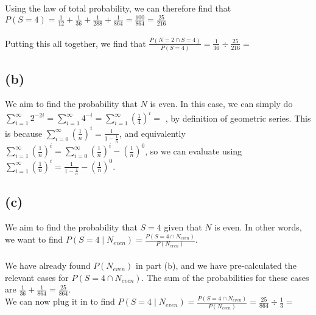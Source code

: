 \documentclass{article}
\begin{document}
{Using the law of total probability, we can therefore find that $P(S = 4) = \frac{1}{12} + \frac{1}{36} + \frac{1}{288} + \frac{1}{864} = \frac{100}{864} = \frac{25}{216}$ \\ \\ 
Putting this all together, we find that $\frac{P(N = 2 \cap S = 4)}{P(S = 4)} = \frac{1}{36} \div \frac{25}{216} =$ 

\subsection*{(b)}
We aim to find the probability that $N$ is even. In this case, we can simply do $\sum_{i = 1}^{\infty} 2^{-2i} = \sum_{i = 1}^{\infty} 4^{-i} = \sum_{i = 1}^{\infty} (\frac{1}{4})^i = $ , by definition of geometric series. This is because $\sum_{i=0}^{\infty} (\frac{1}{n})^i = \frac{1}{1-\frac{1}{n}}$, and equivalently $\sum_{i=1}^{\infty} (\frac{1}{n})^i = \sum_{i=0}^{\infty} (\frac{1}{n})^i - (\frac{1}{n})^0$, so we can evaluate using $\sum_{i=1}^{\infty} (\frac{1}{n})^i = \frac{1}{1-\frac{1}{n}} - (\frac{1}{n})^0$. 

\subsection*{(c)}
We aim to find the probability that $S = 4$ given that $N$ is even. In other words, we want to find $P(S = 4 \mid N_{even}) = \frac{P(S = 4 \cap N_{even})}{P(N_{even})}$. \\ \\
We have already found $P(N_{even})$ in part (b), and we have pre-calculated the relevant cases for $P(S = 4 \cap N_{even})$. The sum of the probabilities for these cases are $\frac{1}{36} + \frac{1}{864} = \frac{25}{864}$. \\
We can now plug it in to find $P(S = 4 \mid N_{even}) = \frac{P(S = 4 \cap N_{even})}{P(N_{even})} = \frac{25}{864} \div \frac{1}{3} = $ 

}

\end{document}
